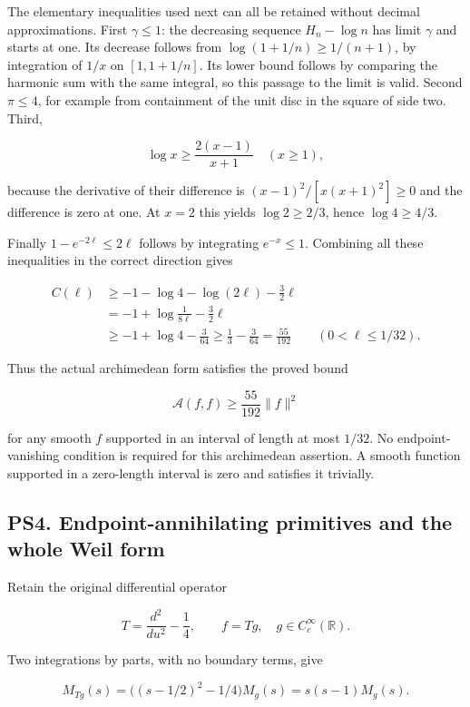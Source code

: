 \documentclass[
  10pt,
  a4paper,
]{article}
\begin{document}
The elementary inequalities used next can all be retained without
decimal approximations. First \(\gamma\le1\): the decreasing sequence
\(H_n-\log n\) has limit \(\gamma\) and starts at one. Its decrease
follows from \(\log(1+1/n)\ge1/(n+1)\), by integration of \(1/x\) on
\([1,1+1/n]\). Its lower bound follows by comparing the harmonic sum
with the same integral, so this passage to the limit is valid. Second
\(\pi\le4\), for example from containment of the unit disc in the square
of side two. Third,

\[
\log x\ge\frac{2(x-1)}{x+1}\quad(x\ge1),
\]

because the derivative of their difference is \((x-1)^2/[x(x+1)^2]\ge0\)
and the difference is zero at one. At \(x=2\) this yields
\(\log2\ge2/3\), hence \(\log4\ge4/3\).

Finally \(1-e^{-2\ell}\le2\ell\) follows by integrating \(e^{-x}\le1\).
Combining all these inequalities in the correct direction gives

\[
\begin{aligned}
C(\ell)
&\ge-1-\log4-\log(2\ell)-\frac32\ell\\
&=-1+\log\frac1{8\ell}-\frac32\ell\\
&\ge-1+\log4-\frac3{64}
\ge\frac13-\frac3{64}=\frac{55}{192}
\qquad(0<\ell\le1/32).
\end{aligned}
\tag{PS8}
\]

Thus the actual archimedean form satisfies the proved bound

\[
\boxed{\mathcal A(f,f)\ge\frac{55}{192}\|f\|^2}
\tag{PS9}
\]

for any smooth \(f\) supported in an interval of length at most
\(1/32\). No endpoint-vanishing condition is required for this
archimedean assertion. A smooth function supported in a zero-length
interval is zero and satisfies it trivially.

\subsection{PS4. Endpoint-annihilating primitives and the whole Weil
form}\label{ps4.-endpoint-annihilating-primitives-and-the-whole-weil-form}

Retain the original differential operator

\[
T=\frac{d^2}{du^2}-\frac14,
\qquad f=Tg,\quad g\in C_c^\infty(\mathbb R).
\tag{PS10}
\]

Two integrations by parts, with no boundary terms, give

\[
M_{Tg}(s)=\bigl((s-1/2)^2-1/4\bigr)M_g(s)
=s(s-1)M_g(s).
\tag{PS11}
\]
\end{document}
